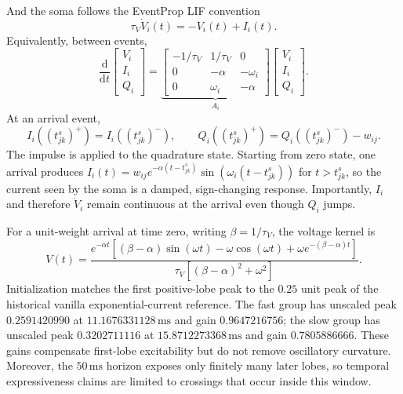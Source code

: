 And the soma follows the EventProp LIF convention
\begin{equation}
    \tau_V\dot V_i(t)=-V_i(t)+I_i(t).
    \label{eq:tes-voltage}
\end{equation}
Equivalently, between events,
\begin{equation}
    \frac{\mathrm d}{\mathrm dt}
    \begin{bmatrix}V_i\\ I_i\\ Q_i\end{bmatrix}
    =
    \underbrace{\begin{bmatrix}
        -1/\tau_V & 1/\tau_V & 0\\
        0 & -\alpha & -\omega_i\\
        0 & \omega_i & -\alpha
    \end{bmatrix}}_{A_i}
    \begin{bmatrix}V_i\\ I_i\\ Q_i\end{bmatrix}.
    \label{eq:tes-real-flow}
\end{equation}
At an arrival event,
\begin{equation}
    I_i\!\left((t^s_{jk})^+\right)
      =I_i\!\left((t^s_{jk})^-\right),
    \qquad
    Q_i\!\left((t^s_{jk})^+\right)
      =Q_i\!\left((t^s_{jk})^-\right)-w_{ij}.
    \label{eq:tes-arrival-jump}
\end{equation}
The impulse is applied to the quadrature state. Starting from zero state, one
arrival produces
$I_i(t)=w_{ij}e^{-\alpha(t-t^s_{jk})}
\sin(\omega_i(t-t^s_{jk}))$ for $t>t^s_{jk}$, so the current seen by the
soma is a damped, sign-changing response. Importantly, $I_i$ and therefore
$\dot V_i$ remain continuous at the arrival even though $Q_i$ jumps.

For a unit-weight arrival at time zero, writing $\beta=1/\tau_V$, the voltage
kernel is
\begin{equation}
 V(t)=\frac{e^{-\alpha t}
 \left[(\beta-\alpha)\sin(\omega t)-\omega\cos(\omega t)
 +\omega e^{-(\beta-\alpha)t}\right]}
 {\tau_V\left[(\beta-\alpha)^2+\omega^2\right]}.
 \label{eq:tes-unit-psp}
\end{equation}
Initialization matches the first positive-lobe peak to the $0.25$ unit peak of
the historical vanilla exponential-current reference. The fast group has
unscaled peak $0.2591420990$ at $11.1676331128\,\mathrm{ms}$ and gain
$0.9647216756$; the slow group has unscaled peak $0.3202711116$ at
$15.8712273368\,\mathrm{ms}$ and gain $0.7805886666$. These gains compensate
first-lobe excitability but do not remove oscillatory curvature. Moreover, the
$50\,\mathrm{ms}$ horizon exposes only finitely many later lobes, so temporal
expressiveness claims are limited to crossings that occur inside this window.

